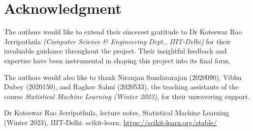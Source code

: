 \documentclass[conference]{IEEEtran}
\begin{document}
    \section*{Acknowledgment}
    \label{sec:acknowledgment}
    The authors would like to extend their sincerest gratitude to Dr Koteswar Rao Jerripothula
    \textit{(Computer Science \& Engineering Dept., IIIT-Delhi)} for their invaluable guidance throughout the project.
    Their insightful feedback and expertise have been instrumental in shaping this project into its final form.

    The authors would also like to thank Niranjan Sundararajan (2020090), Vibhu Dubey (2020150), and Raghav Sahni (2020533),
    the teaching assistants of the course \textit{Statistical Machine Learning (Winter 2023)}, for their unwavering support.

    \begin{thebibliography}{00}
         Dr Koteswar Rao Jerripothula, lecture notes, Statistical Machine Learning (Winter 2023), IIIT-Delhi.
         scikit-learn, \underline{https://scikit-learn.org/stable/}
    \end{thebibliography}
\end{document}
